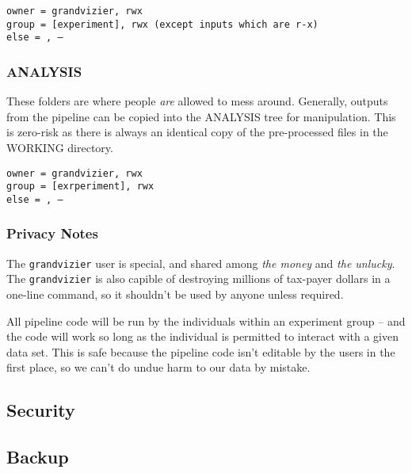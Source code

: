 \documentclass[final,titlepage,letterpaper,oneside,12pt]{article}
\begin{document}
\begin{flushleft}

\texttt{owner = grandvizier, rwx \\
        group = [experiment], rwx (except inputs which are r-x) \\
        else  =            , ---} \\
\end{flushleft}

\subsubsection{ANALYSIS}

These folders are where people \textit{are} allowed to mess around. Generally, outputs from the pipeline can be copied into the ANALYSIS tree for manipulation. This is zero-risk as there is always an identical copy of the pre-processed files in the WORKING directory.

\begin{flushleft}
\texttt{owner = grandvizier, rwx \\
        group = [exrperiment], rwx \\
        else  =            , ---} \\
\end{flushleft}

\subsubsection{Privacy Notes}

The \texttt{grandvizier} user is special, and shared among \textit{the money} and \textit{the unlucky}. The \texttt{grandvizier} is also capible of  destroying millions of tax-payer dollars in a one-line command, so it shouldn't be used by anyone unless required.

All pipeline code will be run by the individuals within an experiment group -- and the code will work so long as the individual is permitted to interact with a given data set. This is safe because the pipeline code isn't editable by the users in the first place, so we can't do undue harm to our data by mistake.

\subsection{Security}
\subsection{Backup}
\end{document}
